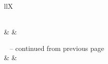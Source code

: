 \begin{xltabular}{\textwidth}{llX}
	\caption[System A activity types]{\textit{System A activity types}}\label{tbl:ch3_systemCActivityTypes}\\
	\toprule
	 &  &  \\
	\midrule
	\endfirsthead

	{\tablename\ \thetable{} -- continued from previous page} \\
	\midrule
	 &  &  \\
	\midrule
	\endhead

	\midrule
	 \\ \midrule
	\endfoot
	\endlastfoot


\end{xltabular}
